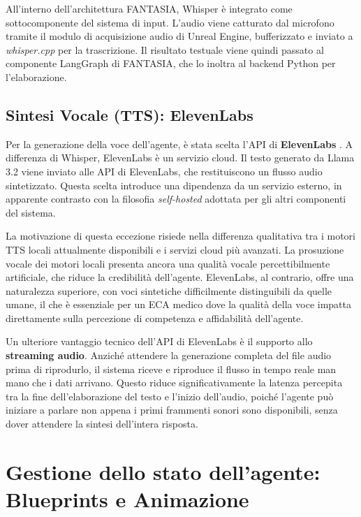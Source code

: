 All'interno dell'architettura FANTASIA, Whisper è integrato come sottocomponente del sistema di input. L'audio viene catturato dal microfono tramite il modulo di acquisizione audio di Unreal Engine, bufferizzato e inviato a \textit{whisper.cpp} per la trascrizione. Il risultato testuale viene quindi passato al componente LangGraph di FANTASIA, che lo inoltra al backend Python per l'elaborazione.

\subsection{Sintesi Vocale (TTS): ElevenLabs}

Per la generazione della voce dell'agente, è stata scelta l'API di \textbf{ElevenLabs} \cite{elevenlabs_api}. A differenza di Whisper, ElevenLabs è un servizio cloud. Il testo generato da Llama 3.2 viene inviato alle API di ElevenLabs, che restituiscono un flusso audio sintetizzato. Questa scelta introduce una dipendenza da un servizio esterno, in apparente contrasto con la filosofia \textit{self-hosted} adottata per gli altri componenti del sistema.

La motivazione di questa eccezione risiede nella differenza qualitativa tra i motori TTS locali attualmente disponibili e i servizi cloud più avanzati. La prosuzione vocale dei motori locali presenta ancora una qualità vocale percettibilmente artificiale, che riduce la credibilità dell'agente. ElevenLabs, al contrario, offre una naturalezza superiore, con voci sintetiche difficilmente distinguibili da quelle umane, il che è essenziale per un ECA medico dove la qualità della voce impatta direttamente sulla percezione di competenza e affidabilità dell'agente.

Un ulteriore vantaggio tecnico dell'API di ElevenLabs è il supporto allo \textbf{streaming audio}. Anziché attendere la generazione completa del file audio prima di riprodurlo, il sistema riceve e riproduce il flusso in tempo reale man mano che i dati arrivano. Questo riduce significativamente la latenza percepita tra la fine dell'elaborazione del testo e l'inizio dell'audio, poiché l'agente può iniziare a parlare non appena i primi frammenti sonori sono disponibili, senza dover attendere la sintesi dell'intera risposta.

\section{Gestione dello stato dell'agente: Blueprints e Animazione}

